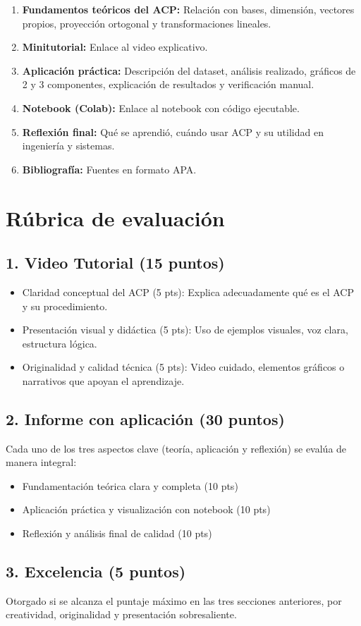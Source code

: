 \documentclass[a4,11pt]{aleph-notas}
\begin{document}
\begin{enumerate}[leftmargin=*, label={\textbf{\arabic*.}}]
\item \textbf{Fundamentos teóricos del ACP:} 
Relación con bases, dimensión, vectores propios, proyección ortogonal y transformaciones lineales.
\item \textbf{Minitutorial:} 
Enlace al video explicativo.
\item \textbf{Aplicación práctica:} 
Descripción del dataset, análisis realizado, gráficos de 2 y 3 componentes, explicación de resultados y verificación manual.
\item \textbf{Notebook (Colab):} 
Enlace al notebook con código ejecutable.
\item \textbf{Reflexión final:} 
Qué se aprendió, cuándo usar ACP y su utilidad en ingeniería y sistemas.
\item \textbf{Bibliografía:} 
Fuentes en formato APA.
\end{enumerate}

\section{Rúbrica de evaluación}

\subsection*{1. Video Tutorial (15 puntos)}
\begin{itemize}[leftmargin=*]
    \item {Claridad conceptual del ACP} (5 pts): 
    Explica adecuadamente qué es el ACP y su procedimiento.
    \item {Presentación visual y didáctica} (5 pts): 
    Uso de ejemplos visuales, voz clara, estructura lógica.
    \item {Originalidad y calidad técnica} (5 pts): 
    Video cuidado, elementos gráficos o narrativos que apoyan el aprendizaje.
\end{itemize}

\subsection*{2. Informe con aplicación (30 puntos)}

Cada uno de los tres aspectos clave (teoría, aplicación y reflexión) se evalúa de manera integral:
\begin{itemize}[leftmargin=*]
    \item {Fundamentación teórica clara y completa} (10 pts)
    \item {Aplicación práctica y visualización con notebook} (10 pts)
    \item {Reflexión y análisis final de calidad} (10 pts)
\end{itemize}

\subsection*{3. Excelencia (5 puntos)}
Otorgado si se alcanza el puntaje máximo en las tres secciones anteriores, por creatividad, originalidad y presentación sobresaliente.
\end{document}
